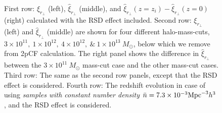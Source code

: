 \documentclass[iop]{emulateapj}
\begin{document}
\begin{figure}
   \caption{\label{fig_sys}
  First row: $\xi_{r_\perp}$ (left), $\hat{\xi}_{r_\perp}$ (middle), and $\hat\xi_{r_\perp}(z=z_i)-\hat\xi_{r_\perp}(z=0)$ (right) calculated with the RSD effect included.
  Second row: $\xi_{r_\perp}$ (left) and $\hat{\xi}_{r_\perp}$ (middle) are shown for four different halo-mass-cuts, $3\times 10^{11},~1\times 10^{12},~4\times 10^{12},~\&~1\times 10^{13}~M_\odot$, 
  below which we remove from 2pCF calculation. 
  The right panel shows the difference in $\hat{\xi}_{r_\perp}$ between the $3\times 10^{11}~M_\odot$ mass-cut case and the other mass-cut cases. 
  Third row: The same as the second row panels, except that the RSD effect is considered.
  Fourth row: The redshift evolution in case of using {\it samples with constant number density} $\bar n=7.3\times 10^{-3} {\rm Mpc}^{-3}h^3$, 
  and the RSD effect is considered. } 
\end{figure}
\end{document}
